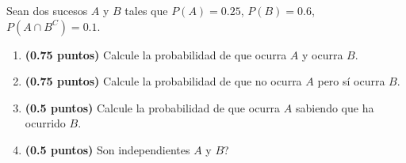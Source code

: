 
Sean dos sucesos $A$ y $B$ tales que $P(A)=0.25$, $P(B)=0.6$, $P(A\cap B^C)=0.1$.
\begin{enumerate}[label=\alph*)]
\item \textbf{(0.75 puntos)} Calcule la probabilidad de que ocurra $A$ y ocurra $B$.
\item \textbf{(0.75 puntos)} Calcule la probabilidad de que no ocurra $A$ pero sí ocurra $B$.
\item \textbf{(0.5 puntos)} Calcule la probabilidad de que ocurra $A$ sabiendo que ha ocurrido $B$.
\item \textbf{(0.5 puntos)} \textquestiondown{}Son independientes $A$ y $B$?
\end{enumerate}
